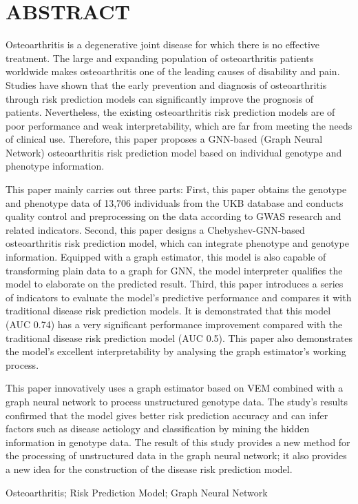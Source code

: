 \titlespacing{\chapter}{0pt}{0mm}{5mm}
\chapter*{ABSTRACT}

Osteoarthritis is a degenerative joint disease for which there is no effective treatment. The large and expanding population of osteoarthritis patients worldwide makes osteoarthritis one of the leading causes of disability and pain. Studies have shown that the early prevention and diagnosis of osteoarthritis through risk prediction models can significantly improve the prognosis of patients. Nevertheless, the existing osteoarthritis risk prediction models are of poor performance and weak interpretability, which are far from meeting the needs of clinical use. Therefore, this paper proposes a GNN-based (Graph Neural Network) osteoarthritis risk prediction model based on individual genotype and phenotype information.



This paper mainly carries out three parts: First, this paper obtains the genotype and phenotype data of 13,706 individuals from the UKB database and conducts quality control and preprocessing on the data according to GWAS research and related indicators. 
Second, this paper designs a Chebyshev-GNN-based osteoarthritis risk prediction model, which can integrate phenotype and genotype information. Equipped with a graph estimator, this model is 
also capable of transforming plain data to a graph for GNN, the model interpreter qualifies the model to elaborate on the predicted result. 
Third, this paper introduces a series of indicators to evaluate the model's predictive performance and compares it with traditional disease risk prediction models. It is demonstrated that this model (AUC 0.74) has a very significant performance improvement compared with the traditional disease risk prediction model (AUC 0.5). This paper also demonstrates the model's excellent interpretability by analysing the graph estimator's working process.



This paper innovatively uses a graph estimator based on VEM combined with a graph neural network to process unstructured genotype data. The study's results confirmed that the model gives better risk prediction accuracy and can infer factors such as disease aetiology and classification by mining the hidden information in genotype data. The result of this study provides a new method for the processing of unstructured data in the graph neural network; it also provides a new idea for the construction of the disease risk prediction model.

\vspace{\baselineskip}
 Osteoarthritis; Risk Prediction Model; Graph Neural Network


\titlespacing{\chapter}{0pt}{-6mm}{5mm}
\clearpage{\pagestyle{empty}\cleardoublepage}
